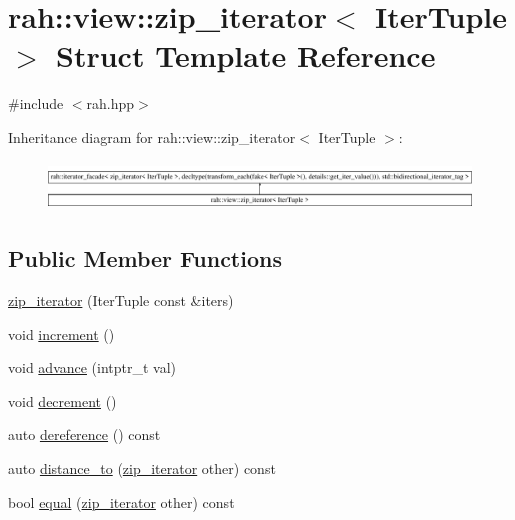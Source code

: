 \hypertarget{structrah_1_1view_1_1zip__iterator}{}\section{rah\+::view\+::zip\+\_\+iterator$<$ Iter\+Tuple $>$ Struct Template Reference}
\label{structrah_1_1view_1_1zip__iterator}


{\ttfamily \#include $<$rah.\+hpp$>$}

Inheritance diagram for rah\+::view\+::zip\+\_\+iterator$<$ Iter\+Tuple $>$\+:\begin{figure}[H]
\begin{center}
\leavevmode
\includegraphics[height=1.291811cm]{structrah_1_1view_1_1zip__iterator}
\end{center}
\end{figure}
\subsection*{Public Member Functions}
\begin{DoxyCompactItemize}
\item 
\mbox{\hyperlink{structrah_1_1view_1_1zip__iterator_a2f6b7c790bcb819a68e4828f6bd6ef79}{zip\+\_\+iterator}} (Iter\+Tuple const \&iters)
\item 
void \mbox{\hyperlink{structrah_1_1view_1_1zip__iterator_a156b181d725c31af3c34180806d6428e}{increment}} ()
\item 
void \mbox{\hyperlink{structrah_1_1view_1_1zip__iterator_abc9b6f7ff787d1a08c4a327d738a1809}{advance}} (intptr\+\_\+t val)
\item 
void \mbox{\hyperlink{structrah_1_1view_1_1zip__iterator_a5618c02a5596c1306d1abc0b1413f086}{decrement}} ()
\item 
auto \mbox{\hyperlink{structrah_1_1view_1_1zip__iterator_a775ecbdf57e02dd926e5b83f0a3bd8c1}{dereference}} () const
\item 
auto \mbox{\hyperlink{structrah_1_1view_1_1zip__iterator_a01c298bede994df318d47205c50cc461}{distance\+\_\+to}} (\mbox{\hyperlink{structrah_1_1view_1_1zip__iterator}{zip\+\_\+iterator}} other) const
\item 
bool \mbox{\hyperlink{structrah_1_1view_1_1zip__iterator_ab8712d7266cdc63143e61841fa371179}{equal}} (\mbox{\hyperlink{structrah_1_1view_1_1zip__iterator}{zip\+\_\+iterator}} other) const
\end{DoxyCompactItemize}
